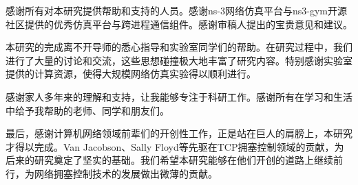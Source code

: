 \begin{thanks}

感谢所有对本研究提供帮助和支持的人员。感谢ns-3网络仿真平台与ns3-gym开源社区提供的优秀仿真平台与跨进程通信组件。感谢审稿人提出的宝贵意见和建议。

本研究的完成离不开导师的悉心指导和实验室同学们的帮助。在研究过程中，我们进行了大量的讨论和交流，这些思想碰撞极大地丰富了研究内容。特别感谢实验室提供的计算资源，使得大规模网络仿真实验得以顺利进行。

感谢家人多年来的理解和支持，让我能够专注于科研工作。感谢所有在学习和生活中给予我帮助的老师、同学和朋友们。

最后，感谢计算机网络领域前辈们的开创性工作，正是站在巨人的肩膀上，本研究才得以完成。Van Jacobson、Sally Floyd等先驱在TCP拥塞控制领域的贡献，为后来的研究奠定了坚实的基础。我们希望本研究能够在他们开创的道路上继续前行，为网络拥塞控制技术的发展做出微薄的贡献。

\end{thanks}
